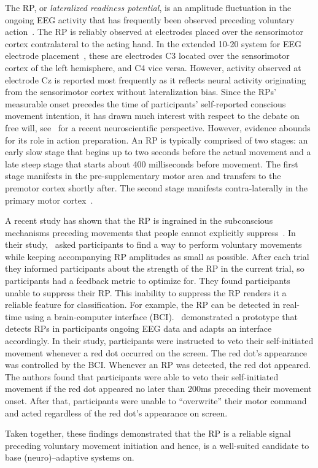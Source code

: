 The RP, or \textit{lateralized readiness potential}, is an amplitude fluctuation in the ongoing EEG activity that has frequently been observed preceding voluntary action~\cite{Deecke1969-bl, Libet1983-qu}. The RP is reliably observed at electrodes placed over the sensorimotor cortex contralateral to the acting hand. In the extended 10-20 system for EEG electrode placement~\cite{Jasper1983-uw}, these are electrodes C3 located over the sensorimotor cortex of the left hemisphere, and C4 vice versa. However, activity observed at electrode Cz is reported most frequently as it reflects neural activity originating from the sensorimotor cortex without lateralization bias. Since the RPs' measurable onset precedes the time of participants' self-reported conscious movement intention, it has drawn much interest with respect to the debate on free will, see~\cite{Schurger2021-vp} for a recent neuroscientific perspective. However, evidence abounds for its role in action preparation. An RP is typically comprised of two stages: an early slow stage that begins up to two seconds before the actual movement and a late steep stage that starts about 400 milliseconds before movement. The first stage manifests in the pre-supplementary motor area and transfers to the premotor cortex shortly after. The second stage manifests contra-laterally in the primary motor cortex~\cite{Shibasaki2006-mt}. 

A recent study has shown that the RP is ingrained in the subconscious mechanisms preceding movements that people cannot explicitly suppress~\cite{Schultze-Kraft2021-cu}. In their study,~\citet{Schultze-Kraft2021-cu} asked participants to find a way to perform voluntary movements while keeping accompanying RP amplitudes as small as possible. After each trial they informed participants about the strength of the RP in the current trial, so participants had a feedback metric to optimize for. They found participants unable to suppress their RP. This inability to suppress the RP renders it a reliable feature for classification. For example, the RP can be detected in real-time using a brain-computer interface (BCI).~\citet{Schultze-Kraft2016-bx} demonstrated a prototype that detects RPs in participants ongoing EEG data and adapts an interface accordingly. In their study, participants were instructed to veto their self-initiated movement whenever a red dot occurred on the screen. The red dot's appearance was controlled by the BCI. Whenever an RP was detected, the red dot appeared. The authors found that participants were able to veto their self-initiated movement if the red dot appeared no later than 200ms preceding their movement onset. After that, participants were unable to ``overwrite'' their motor command and acted regardless of the red dot's appearance on screen.

Taken together, these findings demonstrated that the RP is a reliable signal preceding voluntary movement initiation and hence, is a well-suited candidate to base (neuro)--adaptive systems on.
